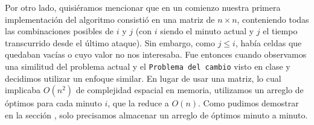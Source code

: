 \documentclass{article}
\begin{document}
Por otro lado, quisiéramos mencionar que en un comienzo nuestra primera implementación del algoritmo consistió en una matriz de $n \times n$, conteniendo todas las combinaciones posibles de $i$ y $j$ (con $i$ siendo el minuto actual y $j$ el tiempo transcurrido desde el último ataque). Sin embargo, como $j \leq i$, había celdas que quedaban vacías o cuyo valor no nos interesaba. Fue entonces cuando observamos una similitud del problema actual y el \texttt{Problema\ del\ cambio} visto en clase y decidimos utilizar un enfoque similar. En lugar de usar una matriz, lo cual implicaba $O(n^2)$ de complejidad espacial en memoria, utilizamos un arreglo de óptimos para cada minuto $i$, que la reduce a $O(n)$. Como pudimos demostrar en la sección , solo precisamos almacenar un arreglo de óptimos minuto a minuto. 
\end{document}
